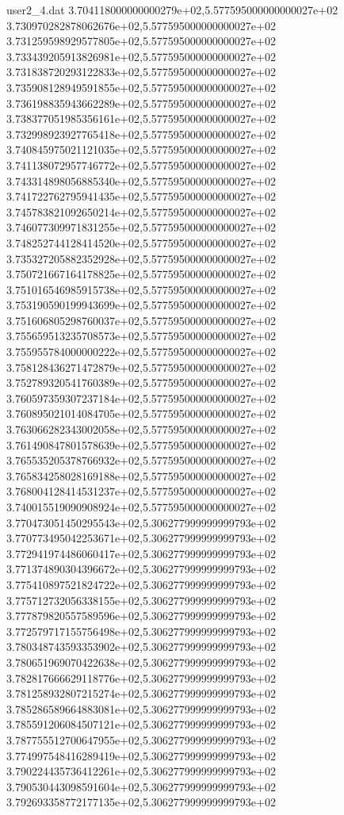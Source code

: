\begin{filecontents}{user2_4.dat}
3.704118000000000279e+02,5.577595000000000027e+02
3.730970282878062676e+02,5.577595000000000027e+02
3.731259598929577805e+02,5.577595000000000027e+02
3.733439205913826981e+02,5.577595000000000027e+02
3.731838720293122833e+02,5.577595000000000027e+02
3.735908128949591855e+02,5.577595000000000027e+02
3.736198835943662289e+02,5.577595000000000027e+02
3.738377051985356161e+02,5.577595000000000027e+02
3.732998923927765418e+02,5.577595000000000027e+02
3.740845975021121035e+02,5.577595000000000027e+02
3.741138072957746772e+02,5.577595000000000027e+02
3.743314898056885340e+02,5.577595000000000027e+02
3.741722762795941435e+02,5.577595000000000027e+02
3.745783821092650214e+02,5.577595000000000027e+02
3.746077309971831255e+02,5.577595000000000027e+02
3.748252744128414520e+02,5.577595000000000027e+02
3.735327205882352928e+02,5.577595000000000027e+02
3.750721667164178825e+02,5.577595000000000027e+02
3.751016546985915738e+02,5.577595000000000027e+02
3.753190590199943699e+02,5.577595000000000027e+02
3.751606805298760037e+02,5.577595000000000027e+02
3.755659513235708573e+02,5.577595000000000027e+02
3.755955784000000222e+02,5.577595000000000027e+02
3.758128436271472879e+02,5.577595000000000027e+02
3.752789320541760389e+02,5.577595000000000027e+02
3.760597359307237184e+02,5.577595000000000027e+02
3.760895021014084705e+02,5.577595000000000027e+02
3.763066282343002058e+02,5.577595000000000027e+02
3.761490847801578639e+02,5.577595000000000027e+02
3.765535205378766932e+02,5.577595000000000027e+02
3.765834258028169188e+02,5.577595000000000027e+02
3.768004128414531237e+02,5.577595000000000027e+02
3.740015519090908924e+02,5.577595000000000027e+02
3.770473051450295543e+02,5.306277999999999793e+02
3.770773495042253671e+02,5.306277999999999793e+02
3.772941974486060417e+02,5.306277999999999793e+02
3.771374890304396672e+02,5.306277999999999793e+02
3.775410897521824722e+02,5.306277999999999793e+02
3.775712732056338155e+02,5.306277999999999793e+02
3.777879820557589596e+02,5.306277999999999793e+02
3.772579717155756498e+02,5.306277999999999793e+02
3.780348743593353902e+02,5.306277999999999793e+02
3.780651969070422638e+02,5.306277999999999793e+02
3.782817666629118776e+02,5.306277999999999793e+02
3.781258932807215274e+02,5.306277999999999793e+02
3.785286589664883081e+02,5.306277999999999793e+02
3.785591206084507121e+02,5.306277999999999793e+02
3.787755512700647955e+02,5.306277999999999793e+02
3.774997548416289419e+02,5.306277999999999793e+02
3.790224435736412261e+02,5.306277999999999793e+02
3.790530443098591604e+02,5.306277999999999793e+02
3.792693358772177135e+02,5.306277999999999793e+02

\end{filecontents}
